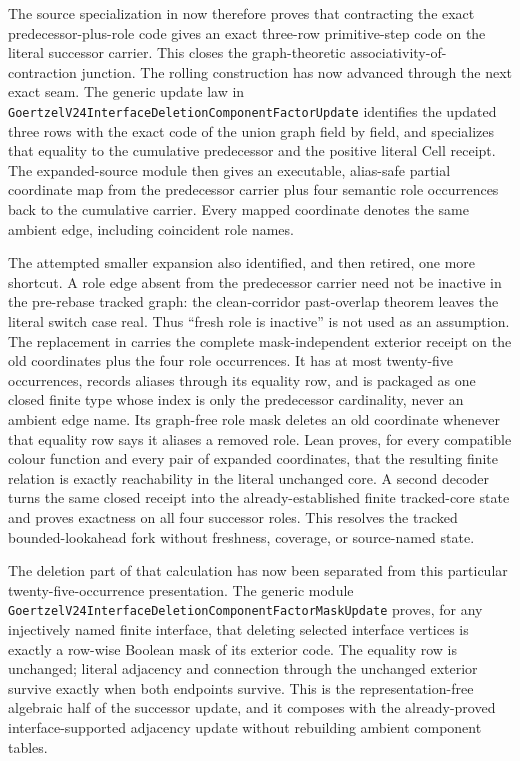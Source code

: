 \documentclass[11pt]{article}
\theoremstyle{definition}
\begin{document}
The source specialization in
 now
therefore proves that contracting the exact predecessor-plus-role code gives
an exact three-row primitive-step code on the literal successor carrier.  This
closes the graph-theoretic associativity-of-contraction junction.  The rolling
construction has now advanced through the next exact seam.  The generic update
law in \texttt{GoertzelV24InterfaceDeletionComponentFactorUpdate} identifies
the updated three rows with the exact code of the union graph field by field,
and
specializes that equality to the cumulative predecessor and the positive
literal Cell receipt.  The expanded-source module then gives an executable,
alias-safe partial coordinate map from the predecessor carrier plus four
semantic role occurrences back to the cumulative carrier.  Every mapped
coordinate denotes the same ambient edge, including coincident role names.

The attempted smaller expansion also identified, and then retired, one more
shortcut.  A role edge absent from the predecessor carrier need not be
inactive in the pre-rebase tracked graph: the clean-corridor past-overlap
theorem leaves the literal switch case real.  Thus ``fresh role is inactive''
is not used as an assumption.  The replacement in
 carries
the complete mask-independent exterior receipt on the old coordinates plus
the four role occurrences.  It has at most twenty-five occurrences, records
aliases through its equality row, and is packaged as one closed finite type
whose index is only the predecessor cardinality, never an ambient edge name.
Its graph-free role mask deletes an old coordinate whenever that equality row
says it aliases a removed role.  Lean proves, for every compatible colour
function and every pair of expanded coordinates, that the resulting finite
relation is exactly reachability in the literal unchanged core.  A second
decoder turns the same closed receipt into the already-established finite
tracked-core state and proves exactness on all four successor roles.  This
resolves the tracked bounded-lookahead fork without freshness, coverage, or
source-named state.

The deletion part of that calculation has now been separated from this
particular twenty-five-occurrence presentation.  The generic module
\texttt{GoertzelV24InterfaceDeletionComponentFactorMaskUpdate} proves, for any
injectively named finite interface, that deleting selected interface vertices
is exactly a row-wise Boolean mask of its exterior code.  The equality row is
unchanged; literal adjacency and connection through the unchanged exterior
survive exactly when both endpoints survive.  This is the representation-free
algebraic half of the successor update, and it composes with the already-proved
interface-supported adjacency update without rebuilding ambient component
tables.
\end{document}
